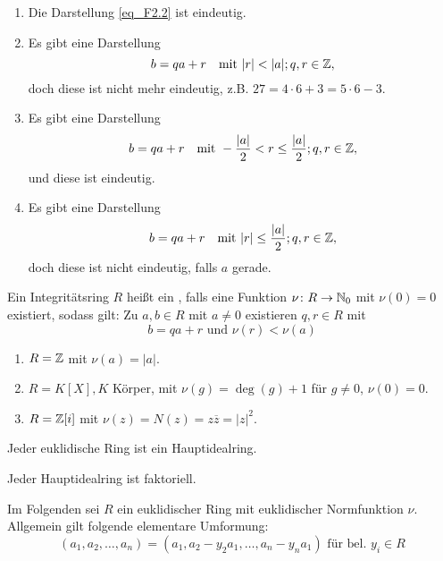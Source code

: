 	\begin{enumerate}[1)]
		\item Die Darstellung \eqref{eq_F2.2} ist eindeutig.
		\item Es gibt eine Darstellung
		\begin{equation}
			b = qa + r \quad \text{mit } |r| < |a|; q,r \in \mathbb{Z}, \label{eq_D'}
		\end{equation}
		doch diese ist nicht mehr eindeutig, z.B. $27 = 4 \cdot 6 + 3 = 5 \cdot 6 - 3$.
		\item Es gibt eine Darstellung
		\begin{equation}
			b = qa + r \quad \text{mit } -\frac{|a|}{2} < r \leq \frac{|a|}{2}; q,r \in \mathbb{Z},
		\end{equation}
		und diese ist eindeutig.
		\item Es gibt eine Darstellung
		\[ b = qa + r \quad \text{mit } |r| \leq \frac{|a|}{2}; q,r \in \mathbb{Z}, \]
		doch diese ist nicht eindeutig, falls $a$ gerade.
	\end{enumerate}

\begin{defn} \label{def_2.3}
	Ein Integritätsring $R$ heißt ein , falls eine Funktion $\nu\colon R \rightarrow \mathbb{N}_0$ mit $\nu(0) = 0$ existiert, sodass gilt: Zu $a, b \in R$ mit $a \neq 0$ existieren $q,r \in R$ mit
	\[b = qa + r \text{ und } \nu(r) < \nu(a) \]
\end{defn}

	\begin{enumerate}[(1)]
		\item $R = \mathbb{Z}$ mit $\nu(a) = |a|$.
		\item $R = K[X], K$ Körper, mit $\nu(g) = \deg(g) + 1$ für $g \neq 0$, $\nu(0) = 0$.
		\item $R = \mathbb{Z}[i]$ mit $\nu(z) = N(z) = z \overline{z} = |z|^2$.
	\end{enumerate}
	
\begin{falko} \label{F2.3}
	Jeder euklidische Ring ist ein Hauptidealring.
\end{falko}

\begin{falko} \label{F2.4}
	Jeder Hauptidealring ist faktoriell.
\end{falko}

Im Folgenden sei $R$ ein euklidischer Ring mit euklidischer Normfunktion $\nu$. Allgemein gilt folgende elementare Umformung:
\begin{equation}
	(a_1,a_2,\dots,a_n) = (a_1, a_2-y_2a_1,\dots,a_n-y_na_1) \text{ für bel. } y_i \in R \label{eq_U}
\end{equation}

